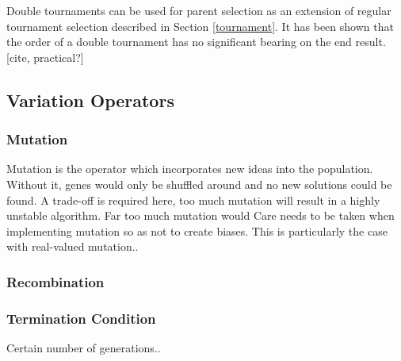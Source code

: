 \documentclass{article}
\begin{document}
\cite{parsimony_pressure}

Double tournaments can be used for parent selection as an extension of regular tournament selection described in Section \ref{tournament}.
It has been shown that the order of a double tournament has no significant bearing on the end result. [cite, practical?]

\cite{multi_objective_bloat}


\subsection{Variation Operators}
\subsubsection{Mutation}
\label{mutation}
Mutation is the operator which incorporates new ideas into the population. Without it, genes would only be shuffled around and no new solutions could be found. %
A trade-off is required here, too much mutation will result in a highly unstable algorithm. Far too much mutation would %
Care needs to be taken when implementing mutation so as not to create biases. This is particularly the case with real-valued mutation.. %

\subsubsection{Recombination}


\subsubsection{Termination Condition}
Certain number of generations..
\end{document}
